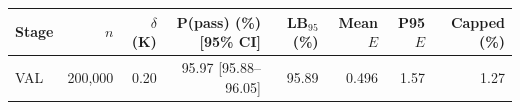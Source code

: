 \begin{tabular}{lrrrrrrr}
\toprule
Stage & $n$ & $\delta$ (K) & P(pass) (\%) [95\% CI] & LB$_{95}$ (\%) & Mean $E$ & P95 $E$ & Capped (\%) \\
\midrule
VAL & 200,000 & 0.20 & 95.97 [95.88--96.05] & 95.89 & 0.496 & 1.57 & 1.27 \\
\bottomrule
\end{tabular}
